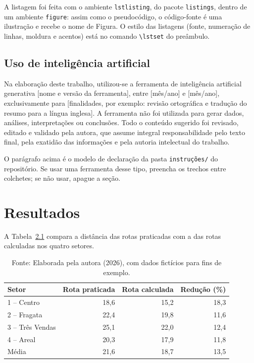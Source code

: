 \documentclass[diss,capa]{texufpel}
\begin{document}
A listagem foi feita com o ambiente \texttt{lstlisting}, do pacote
\texttt{listings}, dentro de um ambiente \texttt{figure}: assim como o
pseudocódigo, o código-fonte é uma ilustração e recebe o nome de Figura. O
estilo das listagens (fonte, numeração de linhas, moldura e acentos) está no
comando \verb|\lstset| do preâmbulo.

\section{Uso de inteligência artificial}

Na elaboração deste trabalho, utilizou-se a ferramenta de inteligência
artificial generativa [nome e versão da ferramenta], entre [mês/ano] e
[mês/ano], exclusivamente para [finalidades, por exemplo: revisão ortográfica
e tradução do resumo para a língua inglesa]. A ferramenta não foi utilizada
para gerar dados, análises, interpretações ou conclusões. Todo o conteúdo
sugerido foi revisado, editado e validado pela autora, que assume integral
responsabilidade pelo texto final, pela exatidão das informações e pela
autoria intelectual do trabalho.

O parágrafo acima é o modelo de declaração da pasta \texttt{instruções/} do
repositório. Se usar uma ferramenta desse tipo, preencha os trechos entre
colchetes; se não usar, apague a seção.

\chapter{Resultados}
\label{cap:resultados}

A Tabela~\ref{tab:resultados} compara a distância das rotas praticadas com a
das rotas calculadas nos quatro setores.

\begin{table}[htbp]
  \caption{Distância percorrida por setor, em quilômetros}
  \label{tab:resultados}
  \centering
  \begin{tabular}{lrrr}
    \hline
    Setor & Rota praticada & Rota calculada & Redução (\%) \\
    \hline
    1 -- Centro      & 18,6 & 15,2 & 18,3 \\
    2 -- Fragata     & 22,4 & 19,8 & 11,6 \\
    3 -- Três Vendas & 25,1 & 22,0 & 12,4 \\
    4 -- Areal       & 20,3 & 17,9 & 11,8 \\
    \hline
    Média            & 21,6 & 18,7 & 13,5 \\
    \hline
  \end{tabular}
  \caption*{Fonte: Elaborada pela autora (2026), com dados fictícios para fins de exemplo.}
\end{table}
\end{document}
